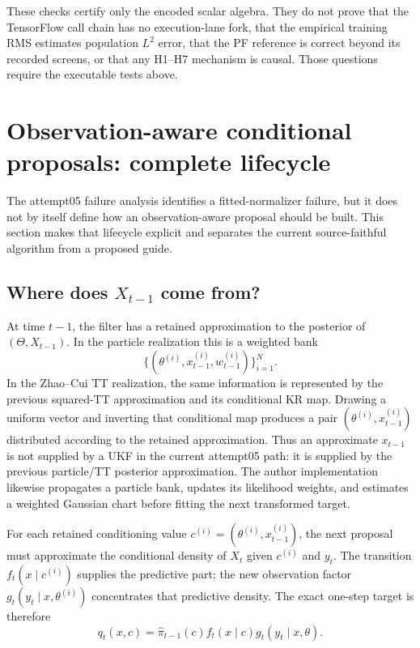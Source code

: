 \documentclass[11pt]{article}
\begin{document}
These checks certify only the encoded scalar algebra. They do not prove that
the TensorFlow call chain has no execution-lane fork, that the empirical
training RMS estimates population $L^2$ error, that the PF reference is
correct beyond its recorded screens, or that any H1--H7 mechanism is causal.
Those questions require the executable tests above.

\section{Observation-aware conditional proposals: complete lifecycle}
\label{sec:observation-aware-lifecycle}

The attempt05 failure analysis identifies a fitted-normalizer failure, but it
does not by itself define how an observation-aware proposal should be built.
This section makes that lifecycle explicit and separates the current
source-faithful algorithm from a proposed guide.

\subsection{Where does $X_{t-1}$ come from?}

At time $t-1$, the filter has a retained approximation to the posterior of
$(\Theta,X_{t-1})$. In the particle realization this is a weighted bank
\[
 \{(\theta^{(i)},x_{t-1}^{(i)},w_{t-1}^{(i)})\}_{i=1}^N.
\]
In the Zhao--Cui TT realization, the same information is represented by the
previous squared-TT approximation and its conditional KR map. Drawing a
uniform vector and inverting that conditional map produces a pair
$(\theta^{(i)},x_{t-1}^{(i)})$ distributed according to the retained
approximation. Thus an approximate $x_{t-1}$ is not supplied by a UKF in the
current attempt05 path: it is supplied by the previous particle/TT posterior
approximation. The author implementation likewise propagates a particle bank,
updates its likelihood weights, and estimates a weighted Gaussian chart before
fitting the next transformed target.

For each retained conditioning value
$c^{(i)}=(\theta^{(i)},x_{t-1}^{(i)})$, the next proposal must approximate
the conditional density of $X_t$ given $c^{(i)}$ and $y_t$. The transition
$f_t(x\mid c^{(i)})$ supplies the predictive part; the new observation factor
$g_t(y_t\mid x,\theta^{(i)})$ concentrates that predictive density. The exact
one-step target is therefore
\begin{equation}
 q_t(x,c)=\widehat\pi_{t-1}(c)f_t(x\mid c)g_t(y_t\mid x,\theta).
 \label{eq:combined-one-step-target}
\end{equation}
\end{document}
